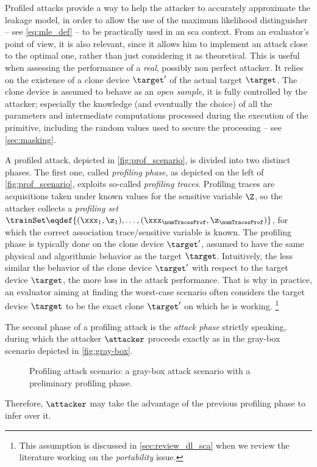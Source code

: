 Profiled attacks provide a way to help the attacker to accurately approximate the leakage model, in order to allow the use of the maximum likelihood distinguisher -- see \autoref{eq:mle_def} -- to be practically used in an \gls{sca} context.
From an evaluator's point of view, it is also relevant, since it allows him to implement an attack close to the optimal one, rather than just considering it as theoretical.
This is useful when assessing the performance of a \emph{real}, possibly non perfect attacker.
It relies on the existence of a clone device \(\target'\) of the actual target \(\target\).
The clone device is assumed to behave as an \emph{open sample}, \ie{} it is fully controlled by the attacker; especially the knowledge (and eventually the choice) of all the parameters and intermediate computations processed during the execution of the primitive, including the random values used to secure the processing -- see \autoref{sec:masking}.

A profiled attack, depicted in \autoref{fig:prof_scenario}, is divided into two distinct phases.
The first one, called \emph{profiling phase}, as depicted on the left of \autoref{fig:prof_scenario}, exploits so-called \emph{profiling traces}.
Profiling traces are acquisitions taken under known values for the sensitive variable \(\Z\), so the attacker collects a \emph{profiling set} \(\trainSet \eqdef \{(\xxx_1, \z_1), \ldots, (\xxx_{\numTracesProf},\z_{\numTracesProf})\}\), for which the correct association trace/sensitive variable is known.
The profiling phase is typically done on the clone device \(\target'\), assumed to have the same physical and algorithmic behavior as the target \(\target\).
Intuitively, the less similar the behavior of the clone device \(\target'\) with respect to the target device \(\target\), the more loss in the attack performance.
That is why in practice, an evaluator aiming at finding the worst-case scenario often considers the target device \(\target\) to be the exact clone \(\target'\) on which he is working.%
\footnote{
    This assumption is discussed in \autoref{sec:review_dl_sca} when we review the literature working on the \emph{portability} issue.
}

The second phase of a profiling attack is the \emph{attack phase} strictly speaking, during which the attacker \(\attacker\) proceeds exactly as in the gray-box scenario depicted in \autoref{fig:gray-box}.
\begin{figure}
    \centering
    
    \caption{Profiling attack scenario: a gray-box attack scenario with a preliminary profiling phase.}
    \label{fig:prof_scenario}
\end{figure}
Therefore, \(\attacker\) may take the advantage of the previous profiling phase to infer over it. 

